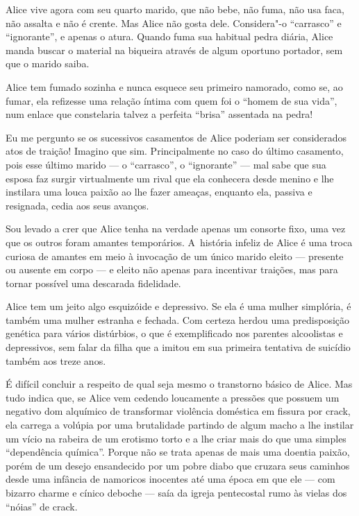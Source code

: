 Alice vive agora com seu quarto marido, que não bebe, não fuma, não usa
faca, não assalta e não é crente. Mas Alice não gosta dele. Considera"-o
``carrasco'' e ``ignorante'', e apenas o atura. Quando fuma sua habitual
pedra diária, Alice manda buscar o material na biqueira através de algum
oportuno portador, sem que o marido saiba.

Alice tem fumado sozinha e nunca esquece seu primeiro namorado, como se,
ao fumar, ela refizesse uma relação íntima com quem foi o ``homem de sua
vida'', num enlace que constelaria talvez a perfeita ``brisa'' assentada
na pedra!

Eu me pergunto se os sucessivos casamentos de Alice poderiam ser
considerados atos de traição! Imagino que sim. Principalmente no caso do
último casamento, pois esse último marido --- o ``carrasco'', o
``ignorante'' --- mal sabe que sua esposa faz surgir virtualmente um
rival que ela conhecera desde menino e lhe instilara uma louca paixão ao
lhe fazer ameaças, enquanto ela, passiva e resignada, cedia aos seus
avanços.

Sou levado a crer que Alice tenha na verdade apenas um consorte fixo,
uma vez que os outros foram amantes temporários. A~história infeliz de
Alice é uma troca curiosa de amantes em meio à invocação de um único
marido eleito --- presente ou ausente em corpo --- e eleito não apenas
para incentivar traições, mas para tornar possível uma descarada
fidelidade.

Alice tem um jeito algo esquizóide e depressivo. Se ela é uma mulher
simplória, é também uma mulher estranha e fechada. Com certeza herdou
uma predisposição genética para vários distúrbios, o que é exemplificado
nos parentes alcoolistas e depressivos, sem falar da filha que a imitou
em sua primeira tentativa de suicídio também aos treze anos.

É difícil concluir a respeito de qual seja mesmo o transtorno básico de
Alice. Mas tudo indica que, se Alice vem cedendo loucamente a pressões
que possuem um negativo dom alquímico de transformar violência doméstica
em fissura por crack, ela carrega a volúpia por uma brutalidade partindo
de algum macho a lhe instilar um vício na rabeira de um erotismo torto e
a lhe criar mais do que uma simples ``dependência química''. Porque não
se trata apenas de mais uma doentia paixão, porém de um desejo
ensandecido por um pobre diabo que cruzara seus caminhos desde uma
infância de namoricos inocentes até uma época em que ele --- com bizarro
charme e cínico deboche --- saía da igreja pentecostal rumo às vielas
dos ``nóias'' de crack.

